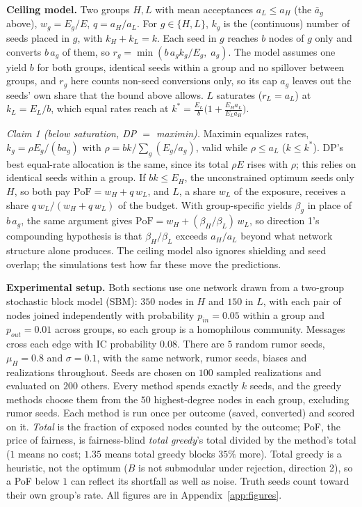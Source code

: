 \textbf{Ceiling model.} Two groups $H,L$ with mean acceptances $a_L\le a_H$ (the $\bar a_g$ above), $w_g=E_g/E$, $q=a_H/a_L$. For $g\in\{H,L\}$, $k_g$ is the (continuous) number of seeds placed in $g$, with $k_H+k_L=k$. Each seed in $g$ reaches $b$ nodes of $g$ only and converts $b\,a_g$ of them, so $r_g=\min(b\,a_g k_g/E_g,\;a_g)$. The model assumes one yield $b$ for both groups, identical seeds within a group and no spillover between groups, and $r_g$ here counts non-seed conversions only, so its cap $a_g$ leaves out the seeds' own share that the bound above allows. $L$ saturates ($r_L=a_L$) at $k_L=E_L/b$, which equal rates reach at $k^*=\frac{E_L}{b}\bigl(1+\frac{E_H a_L}{E_L a_H}\bigr)$.

\emph{Claim 1 (below saturation, DP $=$ maximin).} Maximin equalizes rates, $k_g=\rho E_g/(b a_g)$ with $\rho=bk/\sum_g(E_g/a_g)$, valid while $\rho\le a_L$ ($k\le k^*$). DP's best equal-rate allocation is the same, since its total $\rho E$ rises with $\rho$; this relies on identical seeds within a group. If $bk\le E_H$, the unconstrained optimum seeds only $H$, so both pay $\mathrm{PoF}=w_H+q\,w_L$, and $L$, a share $w_L$ of the exposure, receives a share $q\,w_L/(w_H+q\,w_L)$ of the budget. With group-specific yields $\beta_g$ in place of $b\,a_g$, the same argument gives $\mathrm{PoF}=w_H+(\beta_H/\beta_L)\,w_L$, so direction 1's compounding hypothesis is that $\beta_H/\beta_L$ exceeds $a_H/a_L$ beyond what network structure alone produces. The ceiling model also ignores shielding and seed overlap; the simulations test how far these move the predictions.

\textbf{Experimental setup.} Both sections use one network drawn from a two-group stochastic block model (SBM): $350$ nodes in $H$ and $150$ in $L$, with each pair of nodes joined independently with probability $p_{in}=0.05$ within a group and $p_{out}=0.01$ across groups, so each group is a homophilous community. Messages cross each edge with IC probability $0.08$. There are $5$ random rumor seeds, $\mu_H=0.8$ and $\sigma=0.1$, with the same network, rumor seeds, biases and realizations throughout. Seeds are chosen on $100$ sampled realizations and evaluated on $200$ others. Every method spends exactly $k$ seeds, and the greedy methods choose them from the $50$ highest-degree nodes in each group, excluding rumor seeds. Each method is run once per outcome (saved, converted) and scored on it. \emph{Total} is the fraction of exposed nodes counted by the outcome; PoF, the price of fairness, is fairness-blind \emph{total greedy}'s total divided by the method's total ($1$ means no cost; $1.35$ means total greedy blocks $35\%$ more). Total greedy is a heuristic, not the optimum ($B$ is not submodular under rejection, direction 2), so a PoF below $1$ can reflect its shortfall as well as noise. Truth seeds count toward their own group's rate. All figures are in Appendix~\ref{app:figures}.
